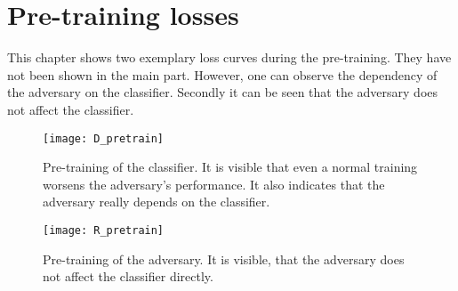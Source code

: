 \chapter{Pre-training losses}
\label{sec:app2}

This chapter shows two exemplary loss curves during the pre-training. They have not been shown in the main part. However, one can observe the dependency of the adversary on the classifier. Secondly it can be seen that the adversary does not affect the classifier. 

\begin{figure}[h]
	\centering
	\texttt{[image: D\_pretrain]}
	\caption[Classifier pretraining]{Pre-training of the classifier. It is visible that even a normal training worsens the adversary's performance. It also indicates that the adversary really depends on the classifier.}
	\label{fig:D_pre}
\end{figure}

\begin{figure}[h]
	\centering
	\texttt{[image: R\_pretrain]}
	\caption[Adversary pretraining]{Pre-training of the adversary. It is visible, that the adversary does not affect the classifier directly.}
	\label{fig:R_pre}
\end{figure}